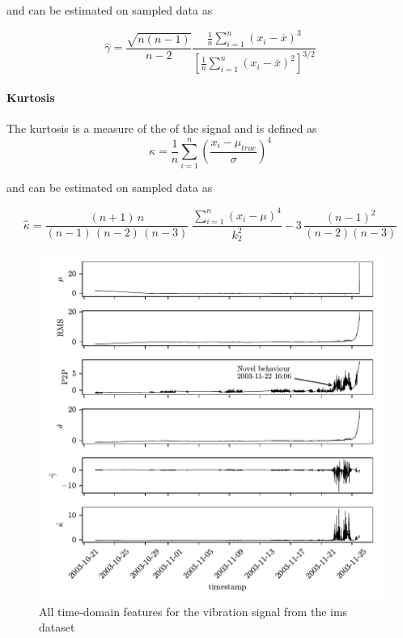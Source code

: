and can be estimated on sampled data as

\begin{equation}
  \hat{\gamma} = \frac{\sqrt{n(n-1)}}{n-2} \frac{\tfrac{1}{n} \sum_{i=1}^n (x_i-\overline{x})^3}{\left[\tfrac{1}{n} \sum_{i=1}^n (x_i-\overline{x})^2 \right]^{3/2}}
\end{equation}

\paragraph{Kurtosis}
The kurtosis is a measure of the  of the signal and is defined as
\begin{equation}
    \kappa = \frac{1}{n}\sum_{i=1}^n \left(\frac{x_i - \mu_{true}}{\sigma}\right)^4
\end{equation}

and can be estimated on sampled data as

\begin{equation}
  \hat{\kappa} = \frac{(n+1)\,n}{(n-1)\,(n-2)\,(n-3)} \; \frac{\sum_{i=1}^n (x_i - \mu)^4}{k_2^2} - 3\,\frac{(n-1)^2}{(n-2) (n-3)}
\end{equation}

\begin{figure}
    \centering
    \includegraphics[scale=1]{images/FeatureExtraction/TDfeatures.pdf}
    \caption{All time-domain features for the  vibration signal from the \gls{ims} dataset}
    \label{fig:IMS_TD_features}
\end{figure}

